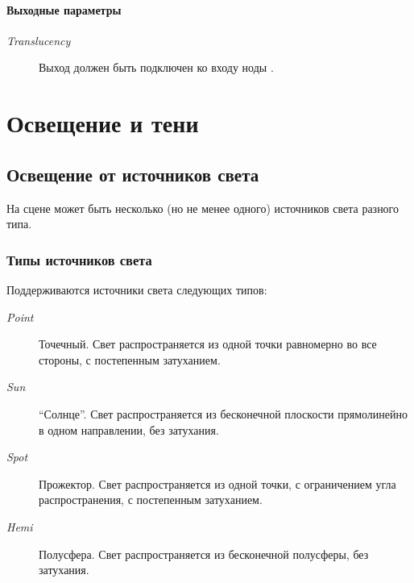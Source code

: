 \documentclass[a4paper,12pt,oneside]{sphinxmanual}
\begin{document}
\subsubsection{Выходные параметры}
\label{node_materials:id7}\begin{description}
\item[{\emph{Translucency}}] \leavevmode
Выход должен быть подключен ко входу  ноды .

\end{description}
\label{lighting:lighting}

\chapter{Освещение и тени}
\label{lighting:index-0}\label{lighting::doc}\label{lighting:id1}

\section{Освещение от источников света}
\label{lighting:id2}\label{lighting:index-1}
На сцене может быть несколько (но не менее одного) источников света разного типа.


\subsection{Типы источников света}
\label{lighting:id3}
Поддерживаются источники света следующих типов:
\begin{description}
\item[{\emph{Point}}] \leavevmode
Точечный. Свет распространяется из одной точки равномерно во все стороны, с постепенным затуханием.

\item[{\emph{Sun}}] \leavevmode
``Солнце''. Свет распространяется из бесконечной плоскости прямолинейно в одном направлении, без затухания.

\item[{\emph{Spot}}] \leavevmode
Прожектор. Свет распространяется из одной точки, с ограничением угла распространения, с постепенным затуханием.

\item[{\emph{Hemi}}] \leavevmode
Полусфера. Свет распространяется из бесконечной полусферы, без затухания.

\end{description}
\end{document}

